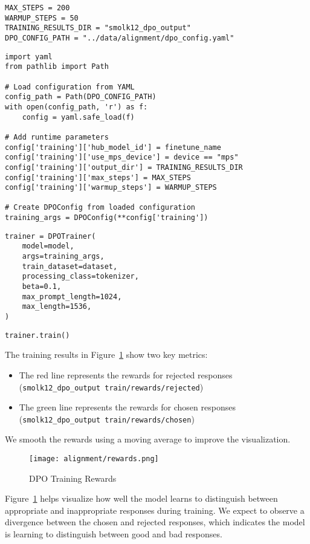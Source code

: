 \begin{verbatim}
MAX_STEPS = 200
WARMUP_STEPS = 50
TRAINING_RESULTS_DIR = "smolk12_dpo_output"
DPO_CONFIG_PATH = "../data/alignment/dpo_config.yaml"
\end{verbatim}

\begin{verbatim}
import yaml
from pathlib import Path

# Load configuration from YAML
config_path = Path(DPO_CONFIG_PATH)
with open(config_path, 'r') as f:
    config = yaml.safe_load(f)

# Add runtime parameters
config['training']['hub_model_id'] = finetune_name
config['training']['use_mps_device'] = device == "mps"
config['training']['output_dir'] = TRAINING_RESULTS_DIR
config['training']['max_steps'] = MAX_STEPS
config['training']['warmup_steps'] = WARMUP_STEPS

# Create DPOConfig from loaded configuration
training_args = DPOConfig(**config['training'])
\end{verbatim}

\begin{verbatim}
trainer = DPOTrainer(
    model=model,
    args=training_args,
    train_dataset=dataset,
    processing_class=tokenizer,
    beta=0.1,
    max_prompt_length=1024,
    max_length=1536,
)
\end{verbatim}

\begin{verbatim}
trainer.train()
\end{verbatim}

The training results in Figure~\ref{fig:rewards} show two key metrics:

\begin{itemize}
\item The red line represents the rewards for rejected responses (\texttt{smolk12\_dpo\_output train/rewards/rejected})
\item The green line represents the rewards for chosen responses (\texttt{smolk12\_dpo\_output train/rewards/chosen})
\end{itemize}

We smooth the rewards using a moving average to improve the visualization.

\begin{figure}[H]
\centering
\texttt{[image: alignment/rewards.png]}
\caption{DPO Training Rewards}
\label{fig:rewards}
\end{figure}

Figure~\ref{fig:rewards} helps visualize how well the model learns to distinguish between appropriate and inappropriate responses during training. We expect to observe a divergence between the chosen and rejected responses, which indicates the model is learning to distinguish between good and bad responses.

